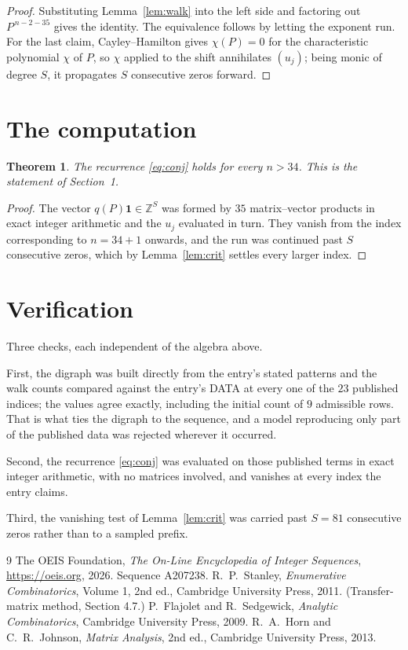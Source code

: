 \documentclass[11pt,a4paper]{article}
\theoremstyle{plain}
\newtheorem{theorem}{Theorem}
\theoremstyle{definition}
\begin{document}
\begin{proof}
Substituting Lemma~\ref{lem:walk} into the left side and factoring out
$P^{\,n-2-35}$ gives the identity. The equivalence follows by letting the exponent
run. For the last claim, Cayley--Hamilton gives $\chi(P)=0$ for the characteristic
polynomial $\chi$ of $P$, so $\chi$ applied to the shift annihilates $(u_j)$; being monic of
degree $S$, it propagates $S$ consecutive zeros forward.
\end{proof}

\section{The computation}

\begin{theorem}
The recurrence \eqref{eq:conj} holds for every $n>34$. This is the statement of
Section~1.
\end{theorem}

\begin{proof}
The vector $q(P)\mathbf{1}\in\mathbb{Z}^{S}$ was formed by $35$ matrix--vector
products in exact integer arithmetic and the $u_j$ evaluated in turn. They vanish from the
index corresponding to $n=34+1$ onwards, and the run was continued past $S$ consecutive
zeros, which by Lemma~\ref{lem:crit} settles every larger index.
\end{proof}

\section{Verification}

Three checks, each independent of the algebra above.

First, the digraph was built directly from the entry's stated patterns and the walk counts
compared against the entry's DATA at every one of the $23$ published indices; the
values agree exactly, including the initial count of $9$ admissible rows. That is
what ties the digraph to the sequence, and a model reproducing only part of the published
data was rejected wherever it occurred.

Second, the recurrence \eqref{eq:conj} was evaluated on those published terms in exact
integer arithmetic, with no matrices involved, and vanishes at every index the entry claims.

Third, the vanishing test of Lemma~\ref{lem:crit} was carried past $S=81$ consecutive
zeros rather than to a sampled prefix.

\begin{thebibliography}{9}
 The OEIS Foundation, \emph{The On-Line Encyclopedia of Integer
Sequences}, \url{https://oeis.org}, 2026. Sequence A207238.
 R.~P.~Stanley, \emph{Enumerative Combinatorics}, Volume 1, 2nd ed.,
Cambridge University Press, 2011. (Transfer-matrix method, Section 4.7.)
 P.~Flajolet and R.~Sedgewick, \emph{Analytic Combinatorics}, Cambridge
University Press, 2009.
 R.~A.~Horn and C.~R.~Johnson, \emph{Matrix Analysis}, 2nd ed., Cambridge
University Press, 2013.
\end{thebibliography}
\end{document}
